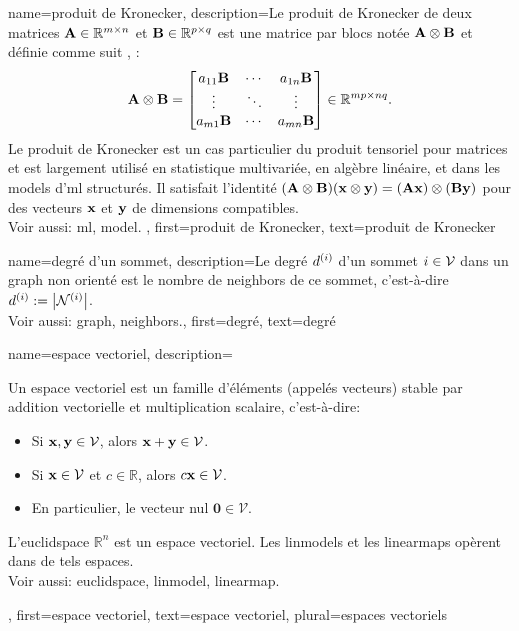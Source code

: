 {name={produit de Kronecker}, 
	description={Le produit de Kronecker  de deux matrices ${\bf A} \in \mathbb{R}^{m \times n}$ 
		et ${\bf B} \in \mathbb{R}^{p \times q}$ est une matrice par blocs notée ${\bf A} \otimes {\bf B}$ 
		et définie comme suit \cite{GolubVanLoanBook}, \cite{HornMatAnalysis}:
		\[
		{\bf A} \otimes {\bf B} =
		\begin{bmatrix}
			a_{11}{\bf B} & \cdots & a_{1n}{\bf B} \\
			\vdots & \ddots & \vdots \\
			a_{m1}{\bf B} & \cdots & a_{mn}{\bf B}
		\end{bmatrix}
		\in \mathbb{R}^{mp \times nq}.
		\]
		Le produit de Kronecker est un cas particulier du produit tensoriel pour matrices et est largement utilisé en statistique multivariée, en algèbre linéaire, et dans les \glspl{model} d'\gls{ml} structurés.  
		Il satisfait l’identité $({\bf A} \otimes {\bf B})({\bf x} \otimes {\bf y}) = ({\bf A}{\bf x}) \otimes ({\bf B}{\bf y})$ pour des vecteurs ${\bf x}$ et ${\bf y}$ de dimensions compatibles.
		\\
		Voir aussi: \gls{ml}, \gls{model}. },
	first={produit de Kronecker},
	text={produit de Kronecker} 
}

{name={degré d’un sommet},
	description={Le degré $d^{(i)}$ d’un sommet $i \in \mathcal{V}$ 
		dans un \gls{graph} non orienté est le nombre de \gls{neighbors} de ce sommet, c’est-à-dire 
		$d^{(i)} := \big|\mathcal{N}^{(i)}\big|$.
		\\ 
		Voir aussi: \gls{graph}, \gls{neighbors}.},
	first={degré},
	text={degré} 
}

{name={espace vectoriel},
	description={Un espace vectoriel est un famille d’éléments 
		(appelés vecteurs) stable par addition vectorielle et multiplication scalaire, c’est-à-dire:
		\begin{itemize}
			\item Si ${\bf x}, {\bf y} \in \mathcal{V}$, alors ${\bf x} + {\bf y} \in \mathcal{V}$.
			\item Si ${\bf x} \in \mathcal{V}$ et $c \in \mathbb{R}$, alors $c {\bf x} \in \mathcal{V}$.
			\item En particulier, le vecteur nul $\mathbf{0} \in \mathcal{V}$.
		\end{itemize}
		L’\gls{euclidspace} $\mathbb{R}^n$ est un espace vectoriel.
		Les \glspl{linmodel} et les \glspl{linearmap} opèrent dans de tels espaces.
		\\
		Voir aussi: \gls{euclidspace}, \gls{linmodel}, \gls{linearmap}.},
	first={espace vectoriel},
	text={espace vectoriel}, plural={espaces vectoriels}
}